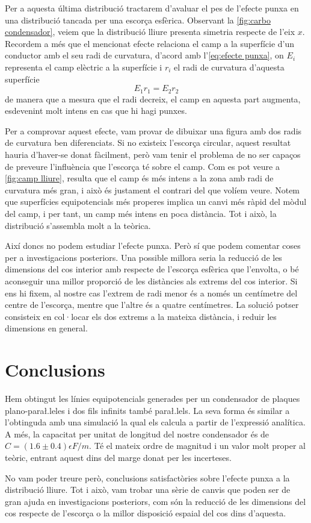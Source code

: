 Per a aquesta última distribució tractarem d'avaluar el pes de l'efecte punxa en una distribució tancada per una escorça esfèrica. Observant la \cref{fig:carbo condensador}, veiem que la distribució lliure presenta simetria respecte de l'eix $x$. Recordem a més que el mencionat efecte relaciona el camp a la superfície d'un conductor amb el seu radi de curvatura, d'acord amb l'\cref{eq:efecte punxa}, on $E_i$ representa el camp elèctric a la superfície i $r_i$ el radi de curvatura d'aquesta superfície
\begin{equation} \label{eq:efecte punxa}
	E_1r_1=E_2r_2
\end{equation}
de manera que a mesura que el radi decreix, el camp en aquesta part augmenta, esdevenint molt intens en cas que hi hagi punxes.

Per a comprovar aquest efecte, vam provar de dibuixar una figura amb dos radis de curvatura ben diferenciats. Si no existeix l'escorça circular, aquest resultat hauria d'haver-se donat fàcilment, però vam tenir el problema de no ser capaços de preveure l'influència que l'escorça té sobre el camp. Com es pot veure a \cref{fig:camp lliure}, resulta que el camp és més intens a la zona amb radi de curvatura més gran, i això és justament el contrari del que volíem veure. Notem que superfícies equipotencials més properes implica un canvi més ràpid del mòdul del camp, i per tant, un camp més intens en poca distància. Tot i això, la distribució s'assembla molt a la teòrica.

Així doncs no podem estudiar l'efecte punxa. Però sí que podem comentar coses per a investigacions posteriors. Una possible millora seria la reducció de les dimensions del cos interior amb respecte de l'escorça esfèrica que l'envolta, o bé aconseguir una millor proporció de les distàncies als extrems del cos interior. Si ens hi fixem, al nostre cas l'extrem de radi menor és a només un centímetre del centre de l'escorça, mentre que l'altre és a quatre centímetres. La solució potser consisteix en col·locar els dos extrems a la mateixa distància, i reduir les dimensions en general.

\section{Conclusions}
Hem obtingut les línies equipotencials generades per un condensador de plaques plano-para\l.leles i dos fils infinits també para\l.lels. La seva forma és similar a l'obtinguda amb una simulació la qual els calcula a partir de l'expressió analítica. A més, la capacitat per unitat de longitud del nostre condensador és de $C=(1.6\pm0.4)\epsilon F/m$. Té el mateix ordre de magnitud i un valor molt proper al teòric, entrant aquest dins del marge donat per les incerteses.

No vam poder treure però, conclusions satisfactòries sobre l'efecte punxa a la distribució lliure. Tot i això, vam trobar una sèrie de canvis que poden ser de gran ajuda en investigacions posteriors, com són la reducció de les dimensions del cos respecte de l'escorça o la millor disposició espaial del cos dins d'aquesta.

